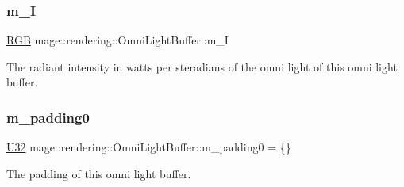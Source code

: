 \subsubsection{\texorpdfstring{m\+\_\+I}{m\_I}}
{\footnotesize\ttfamily \mbox{\hyperlink{structmage_1_1_r_g_b}{R\+GB}} mage\+::rendering\+::\+Omni\+Light\+Buffer\+::m\+\_\+I}

The radiant intensity in watts per steradians of the omni light of this omni light buffer. \mbox{\label{structmage_1_1rendering_1_1_omni_light_buffer_a3b440492e1a9fc48c6f109e5787aa4c7}} 
\subsubsection{\texorpdfstring{m\+\_\+padding0}{m\_padding0}}
{\footnotesize\ttfamily \mbox{\hyperlink{namespacemage_aa5d6eaabaac3cdd01873d6a3d27e90f3}{U32}} mage\+::rendering\+::\+Omni\+Light\+Buffer\+::m\+\_\+padding0 = \{\}}

The padding of this omni light buffer. 
